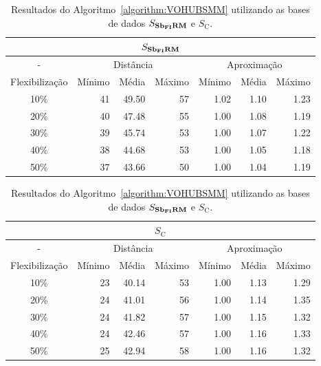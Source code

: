 \begin{table}[!htb]
  \caption{Resultados do Algoritmo~\ref{algorithm:VOHUBSMM} utilizando as bases de dados $S_{\textbf{Sb\textsubscript{FI}RM}}{}$ e $S_{\text{C}}$.}
  \label{table:ZTVCHZCR}
  \centering
  \begin{tabular}{|c|r|r|r|r|r|r|}
    \hline
    \multicolumn{7}{|c|}{$S_{\textbf{Sb\textsubscript{FI}RM}}{}$}                                                                      \\ \hline
      -            & \multicolumn{3}{c|}{Distância}             & \multicolumn{3}{c|}{Aproximação}           \\ \hline
    Flexibilização & Mínimo       & Média        & Máximo       & Mínimo       & Média        & Máximo       \\ \hline  
    10\%           & 41           & 49.50        & 57           & 1.02         & 1.10         & 1.23         \\ \hline
    20\%           & 40           & 47.48        & 55           & 1.00         & 1.08         & 1.19         \\ \hline
    30\%           & 39           & 45.74        & 53           & 1.00         & 1.07         & 1.22         \\ \hline
    40\%           & 38           & 44.68        & 53           & 1.00         & 1.05         & 1.18         \\ \hline
    50\%           & 37           & 43.66        & 50           & 1.00         & 1.04         & 1.19         \\ \hline    
  \end{tabular}

  \vspace{5mm}

  \begin{tabular}{|c|r|r|r|r|r|r|}
    \hline
    \multicolumn{7}{|c|}{$S_{\text{C}}$}                                                                     \\ \hline
      -            & \multicolumn{3}{c|}{Distância}             & \multicolumn{3}{c|}{Aproximação}           \\ \hline
    Flexibilização & Mínimo       & Média        & Máximo       & Mínimo       & Média        & Máximo       \\ \hline  
    10\%           & 23           & 40.14        & 53           & 1.00         & 1.13         & 1.29         \\ \hline
    20\%           & 24           & 41.01        & 56           & 1.00         & 1.14         & 1.35         \\ \hline
    30\%           & 24           & 41.82        & 57           & 1.00         & 1.15         & 1.32         \\ \hline
    40\%           & 24           & 42.46        & 57           & 1.00         & 1.16         & 1.33         \\ \hline
    50\%           & 25           & 42.94        & 58           & 1.00         & 1.16         & 1.32         \\ \hline    
  \end{tabular}
\end{table}

